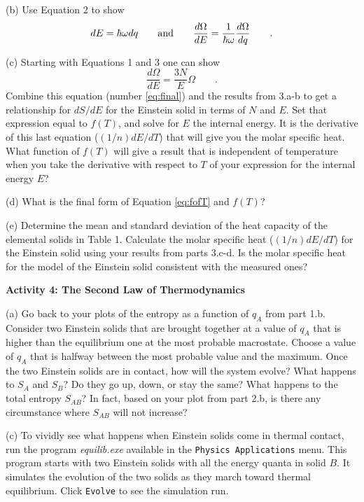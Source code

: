 (b) Use Equation 2 to show 
\begin{equation}
dE = \hbar \omega dq \qquad {\rm and} \qquad  
    \frac{d\Omega}{dE}=\frac{1}{\hbar\omega} \frac{d\Omega}{dq}
\qquad .
\end{equation}
\answerspace{20mm}

(c) Starting with Equations 1 and 3 one can show
\begin{equation}\label{eq:final}
\frac{d\Omega}{dE} = \frac{3N}{E} \Omega
\qquad .
\end{equation}
Combine this equation (number \ref{eq:final}) and the  results from 3.a-b to 
get a relationship for $dS/dE$ for the Einstein solid in terms
of $N$ and $E$.
Set that expression equal to $f(T)$,
and solve for $E$ the internal energy.
It is the derivative of this last equation ($(1/n)dE/dT$) that will give you the molar specific heat.
What function of $f(T)$ will give a result that is independent of temperature when you
take the derivative with respect to $T$ of your expression for the internal energy $E$?
\answerspace{45mm}

(d)  What is the final form of Equation \ref{eq:fofT} and $f(T)$?
\answerspace{20mm}


(e) Determine the mean and standard deviation of the heat capacity of the elemental solids in
Table 1.
Calculate the molar specific heat ($(1/n)dE/dT$) for the Einstein solid using your results from
parts 3.c-d.
Is the molar specific heat for the model of the Einstein solid consistent with the measured ones?
\vspace{45mm}


\textbf{Activity 4: The Second Law of Thermodynamics}

(a) Go back to your plots of the entropy as a function of $q_A$ from part 1.b. 
Consider two Einstein solids that are brought together at a value of $q_A$ that is higher
than the equilibrium one at the most probable macrostate.
Choose a value of $q_A$ that is halfway between the most probable value and the maximum.
Once the two Einstein solids are in contact, how will the system evolve?
What happens to $S_A$ and $S_B$? Do they go up, down, or stay the same?
What happens to the total entropy $S_{AB}$?
In fact, based on your plot from part 2.b, is there any circumstance where
$S_{AB}$ will not increase?
\vspace{30mm}

(c) To  vividly see what happens when Einstein solids come in thermal contact,
run the program {\it equilib.exe} available in the {\tt Physics Applications} menu.
This program starts with two Einstein solids with all the energy quanta in solid $B$.
It simulates the evolution of the two solids as they march toward
thermal equilibrium.
Click {\tt Evolve} to see the simulation run.

